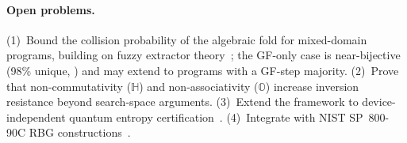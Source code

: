 \documentclass[11pt,a4paper]{article}
\begin{document}
\paragraph{Open problems.}
(1)~Bound the collision probability of the algebraic fold for
mixed-domain programs, building on fuzzy extractor
theory~\cite{dodis2008fuzzy}; the GF-only case is near-bijective
(98\% unique, ) and may extend to programs with
a GF-step majority.
(2)~Prove that non-commutativity ($\mathbb{H}$) and
non-associativity ($\mathbb{O}$) increase inversion resistance
beyond search-space arguments.
(3)~Extend the framework to device-independent quantum entropy
certification~\cite{aaronson2025certified}.
(4)~Integrate with NIST SP~800-90C RBG
constructions~\cite{nist2025sp80090c}.




\end{document}
